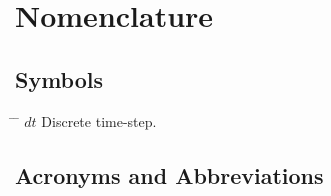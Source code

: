 \chapter*{Nomenclature}

\section*{Symbols}
\begin{tabbing}
 \hspace*{1.6cm} \= \hspace*{8cm} \= \kill
 $dt$ \> Discrete time-step. \> [$s$] \\[0.5ex]
\end{tabbing}

\section*{Acronyms and Abbreviations}
\begin{acronym}[Bash]
\end{acronym}
